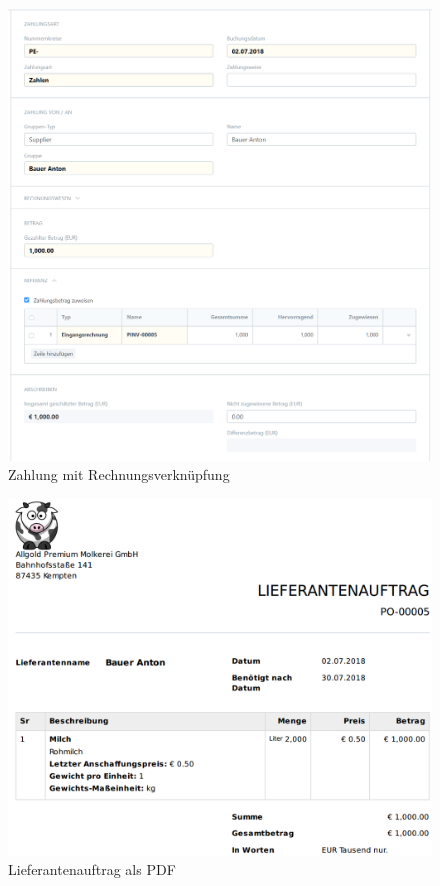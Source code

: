 \begin{figure}
  \centering
  \includegraphics[width=\textwidth]{Bilder/Zahlung.PNG}
  \caption{Zahlung mit Rechnungsverknüpfung}
  \label{fig:zahlung}
\end{figure}
\begin{figure}
  \centering
  \includegraphics[width=\textwidth]{Bilder/Auftrag_Mail.PNG}
  \caption{Lieferantenauftrag als PDF}
  \label{fig:auftrPdf}
\end{figure}
